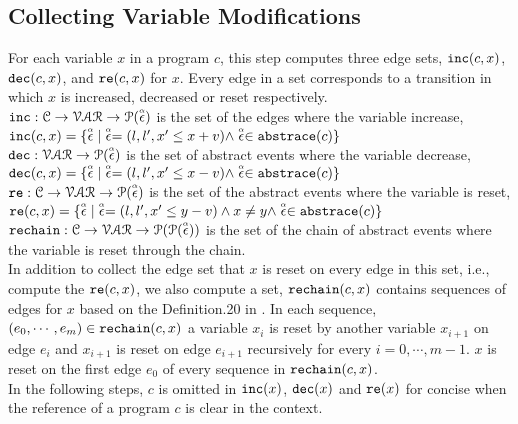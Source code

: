   \subsection{Collecting Variable Modifications}
  For each variable $x$ in a program $c$, this step computes three edge sets, $\mathtt{inc}(c, x)$, $\mathtt{dec}(c, x)$,
  and $\mathtt{re}(c, x)$ for $x$.
  Every edge in a set corresponds to a transition in which $x$ is increased,
  decreased
  or reset
  respectively.
  \\
  $\mathtt{inc}: \mathcal{C} \to \mathcal{VAR} \to \mathcal{P}(\stackrel{\scriptscriptstyle{\alpha}}{\mathtt{\epsilon}{}}) $
  is the set of the edges where the variable increase, 
  \\
  $\mathtt{inc}(c, x) = \{ \stackrel{\scriptscriptstyle{\alpha}}{\mathtt{\epsilon}{}} | \stackrel{\scriptscriptstyle{\alpha}}{\mathtt{\epsilon}{}} = (l, l', x' \leq x + v) \land \stackrel{\scriptscriptstyle{\alpha}}{\mathtt{\epsilon}{}} \in \mathtt{abs}{\mathtt{trace}}(c)\}$
  \\
  $\mathtt{dec}: \mathcal{VAR} \to \mathcal{P}(\stackrel{\scriptscriptstyle{\alpha}}{\mathtt{\epsilon}{}}) $
  is the set of abstract events where the variable decrease,
  \\
  $\mathtt{dec}(c, x) = \{\stackrel{\scriptscriptstyle{\alpha}}{\mathtt{\epsilon}{}}| \stackrel{\scriptscriptstyle{\alpha}}{\mathtt{\epsilon}{}} = (l, l', x' \leq x - v) \land \stackrel{\scriptscriptstyle{\alpha}}{\mathtt{\epsilon}{}} \in \mathtt{abs}{\mathtt{trace}}(c)\}$
  \\
  $\mathtt{re}: \mathcal{C} \to \mathcal{VAR} \to \mathcal{P}(\stackrel{\scriptscriptstyle{\alpha}}{\mathtt{\epsilon}{}}) $
  is the set of the abstract events where the variable is reset,
  \\
  $\mathtt{re}(c, x) = \{\stackrel{\scriptscriptstyle{\alpha}}{\mathtt{\epsilon}{}}| \stackrel{\scriptscriptstyle{\alpha}}{\mathtt{\epsilon}{}} = (l, l', x' \leq y - v) \land x \neq y \land \stackrel{\scriptscriptstyle{\alpha}}{\mathtt{\epsilon}{}} \in \mathtt{abs}{\mathtt{trace}}(c)\}$
  \\
  $\mathtt{rechain}: \mathcal{C} \to \mathcal{VAR} \to \mathcal{P}(\mathcal{P}(\stackrel{\scriptscriptstyle{\alpha}}{\mathtt{\epsilon}{}})) $
  is the set of the chain of abstract events where the variable is reset through the chain.
  \\
  In addition to
  collect the edge set that $x$ is reset on every edge in this set, i.e., compute the $\mathtt{re}(c, x)$,
  we also compute a set, $\mathtt{rechain}(c, x)$ contains sequences of edges for $x$
  based on the Definition.20 in \cite{sinn2017complexity}.
  In each sequence, $(e_0, \cdots, e_m) \in \mathtt{rechain}(c, x)$
  a variable $x_i$ is reset by another variable $x_{i + 1}$ on edge $e_{i}$
  and $x_{i + 1}$ is reset on edge $e_{i + 1}$ recursively
  for every $i = 0, \cdots, m - 1$.
  $x$ is reset on the first edge $e_0$ of every sequence in $\mathtt{rechain}(c, x)$.
  \\
  In the following steps, $c$ is omitted in $\mathtt{inc}(x)$,
  $\mathtt{dec}(x)$ and $\mathtt{re}(x)$ for concise when the reference of a program $c$ is clear in the context.

